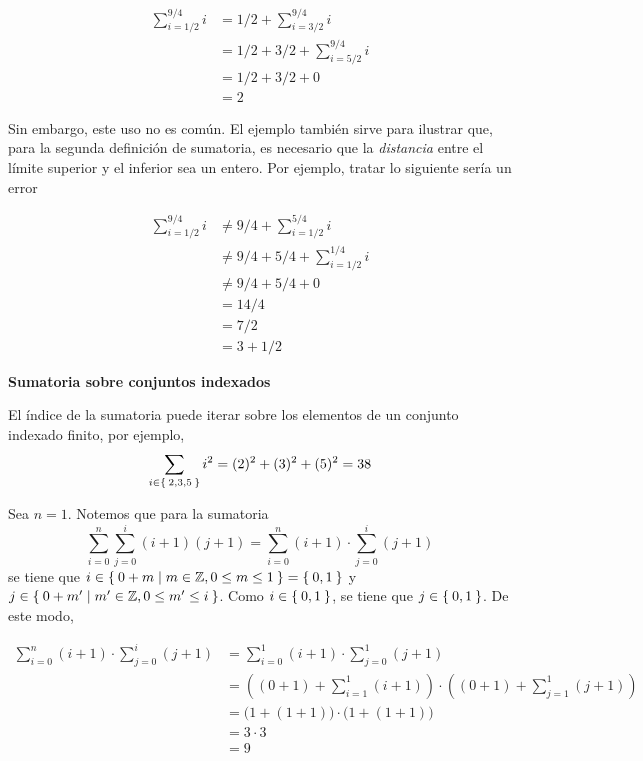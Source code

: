 \begin{align*}
  \sum_{i=1/2}^{9/4} i &= 1/2 + \sum_{i=3/2}^{9/4} i \\
  &= 1/2 + 3/2 + \sum_{i=5/2}^{9/4} i\\
  &= 1/2 + 3/2 + 0\\
  &= 2
\end{align*}

Sin embargo, este uso no es común. El ejemplo también sirve para ilustrar que, para la segunda definición de sumatoria, es necesario que la \textit{distancia} entre el límite superior y el inferior sea un entero. Por ejemplo, tratar lo siguiente sería un error

\begin{align*}
  \sum_{i=1/2}^{9/4} i &\neq 9/4 + \sum_{i=1/2}^{5/4} i\\
  &\neq 9/4 + 5/4 + \sum_{i=1/2}^{1/4} i\\
  &\neq 9/4 + 5/4 + 0\\
  &= 14/4\\
  &= 7/2\\
  &= 3 + 1/2
\end{align*}

\textbf{Sumatoria sobre conjuntos indexados}

El índice de la sumatoria puede iterar sobre los elementos de un conjunto indexado finito, por ejemplo, \[\sum_{i\in \Set{2, 3, 5}} i^2 = (2)^2 + (3)^2 + (5)^2 = 38\]

Sea $n=1$. Notemos que para la sumatoria \[\sum_{i=0}^{n} \sum_{j=0}^{i} (i+1)(j+1) = \sum_{i=0}^{n} (i + 1) \cdot \sum_{j=0}^{i} (j+1)\] se tiene que $i\in \Set{0+m|m\in \mathbb{Z}, 0\leq m\leq 1}=\Set{0, 1}$ y $j\in \Set{0+m'|m'\in \mathbb{Z}, 0\leq m'\leq i}$. Como $i\in \Set{0, 1}$, se tiene que $j\in \Set{0, 1}$. De este modo,

\begin{align*}
  \sum_{i=0}^{n} (i + 1) \cdot \sum_{j=0}^{i} (j+1) &= \sum_{i=0}^{1} (i + 1) \cdot \sum_{j=0}^{1} (j+1)\\
  &= \left((0+1)+ \sum_{i=1}^{1} (i + 1)\right) \cdot \left((0+1) + \sum_{j=1}^{1}(j+1)\right)\\
  &= \big(1 + (1 + 1)\big) \cdot \big(1 + (1+1)\big)\\
  &= 3 \cdot 3\\
  &= 9
\end{align*}

